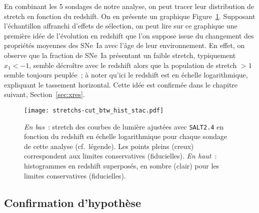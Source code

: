 \documentclass[../main/main.tex]{subfiles}
\begin{document}
En combinant les 5 sondages de notre analyse, on peut tracer leur distribution
de stretch en fonction du redshift. On en présente un graphique
Figure~\ref{fig:sample}. Supposant l'échantillon affranchi d'effets de
sélection, on peut lire sur ce graphique une première idée de l'évolution en
redshift que l'on suppose issue du changement des propriétés moyennes des SNe~Ia
avec l'âge de leur environnement. En effet, on observe que la fraction de SNe~Ia
présentant un faible stretch, typiquement $x_1 < -1$, semble décroître avec le
redshift alors que la population de stretch $> 1$ semble toujours peuplée~; à
noter qu'ici le redshift est en échelle logarithmique, expliquant le tassement
horizontal. Cette idée est confirmée dans le chapitre suivant,
Section~\ref{sec:xres}.

\begin{figure}
    \centering
    \texttt{[image: stretchs-cut\_btw\_hist\_stac.pdf]}
    \caption[Présentation des données de stretch en fonction du
    redshift.]{\textit{En bas}~: stretch des courbes de lumière ajustées avec
        \textsc{\texttt{SALT2.4}} en fonction du redshift en échelle
        logarithmique pour chaque sondage de cette analyse (cf.~légende). Les
        points pleins (creux) correspondent aux limites conservatives
        (fiducielles). \textit{En haut}~: histogrammes en redshift superposés,
        en sombre (clair) pour les limites conservatives
    (fiducielles).}\label{fig:sample}
\end{figure}

\subsection{Confirmation d'hypothèse}\label{ssec:testvl}

\newpage

\minilof
\minilot


\shorthandoff{:}

\end{document}
